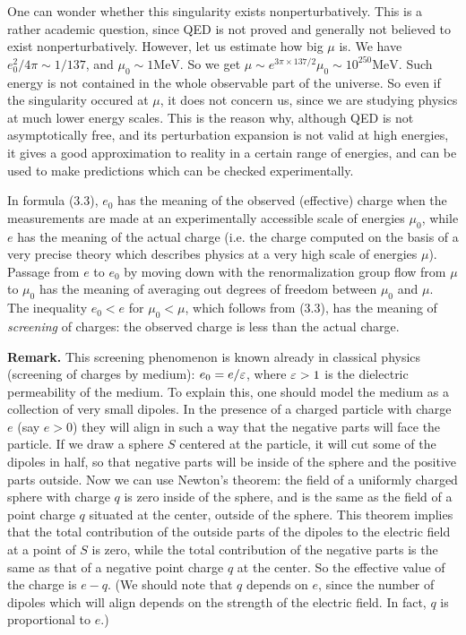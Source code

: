 One can wonder whether this singularity exists nonperturbatively.
This is a rather academic question, since QED is not proved and 
generally not believed to exist nonperturbatively. However, 
let us estimate how big $\mu$ is. We have $e_0^2/4\pi\sim 1/137$, and
$\mu_0\sim 1 \text{MeV}$. So we get
$\mu\sim e^{3\pi\times 137/2}\mu_0\sim 10^{250}\text{MeV}$. 
Such energy is not contained in the whole observable part of the universe. 
So even if the singularity occured at $\mu$, it does not concern us, since we
are studying physics at much lower energy scales. 
This is the reason why, although QED is not asymptotically free, and its 
perturbation expansion is not valid at high energies, it gives a 
good approximation to reality in a certain range of energies, and 
can be used to make predictions which can be checked experimentally. 

In formula (3.3), $e_0$ has the meaning of the 
observed (effective) charge when the measurements are made at an 
experimentally accessible scale of energies $\mu_0$, 
while $e$ has the meaning of the actual charge (i.e. the charge computed 
on the basis of a very precise theory which describes physics at 
a very high scale of energies $\mu$). Passage from $e$ to $e_0$ by moving down
with the renormalization group flow from $\mu$ to $\mu_0$ has the  
meaning of averaging out degrees of freedom between $\mu_0$ and $\mu$. 
The inequality $e_0<e$ for $\mu_0<\mu$, which follows from (3.3),
has the meaning of {\it screening} of charges: the observed charge 
is less than the actual charge. 

{\bf Remark.} This screening phenomenon is known 
already in classical physics (screening of charges by medium): 
$e_0=e/\varepsilon$, where $\varepsilon>1$ is the dielectric permeability of the medium. 
To explain this, one should model the medium as a collection 
of very small dipoles. In the presence of 
a charged particle with charge $e$ (say $e>0$) 
they will align in such a way that the negative parts will face
the particle. If we draw a sphere $S$ centered at the particle, it will cut 
some of the dipoles in half, so that negative parts will be inside of the 
sphere and the positive parts outside. Now we can use Newton's theorem:
the field of a uniformly charged sphere with charge $q$ is zero
inside of the sphere, and is the same as the field of a point charge $q$ 
situated at the center,  outside of the sphere.  
This theorem implies that the total contribution 
 of the outside parts of the dipoles 
to the electric field at a point of $S$ is zero, while the total contribution 
of the negative parts is the same as that of 
a negative point charge $q$ at the center. So the effective
value of the charge is $e-q$. 
(We should note that $q$ depends on $e$, since the 
number of dipoles which will align depends on the strength of the electric 
field. In fact, $q$ is proportional to $e$.)

